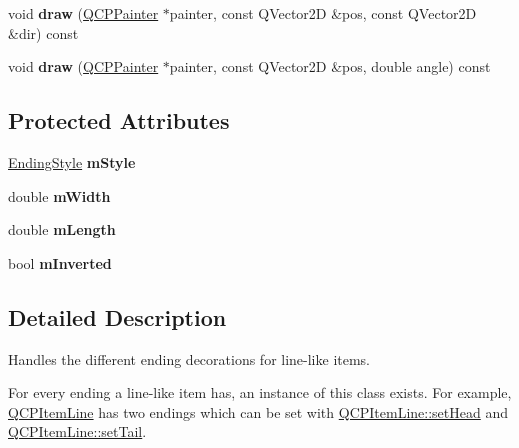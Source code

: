 \begin{DoxyCompactItemize}
\item 
\hypertarget{classQCPLineEnding_ac4b2fa94bd27b2f008b5fc090fcd7c0b}{void {\bfseries draw} (\hyperlink{classQCPPainter}{Q\-C\-P\-Painter} $\ast$painter, const Q\-Vector2\-D \&pos, const Q\-Vector2\-D \&dir) const }\label{classQCPLineEnding_ac4b2fa94bd27b2f008b5fc090fcd7c0b}

\item 
\hypertarget{classQCPLineEnding_a05c143b1f66cb68d746c309523c45e3e}{void {\bfseries draw} (\hyperlink{classQCPPainter}{Q\-C\-P\-Painter} $\ast$painter, const Q\-Vector2\-D \&pos, double angle) const }\label{classQCPLineEnding_a05c143b1f66cb68d746c309523c45e3e}

\end{DoxyCompactItemize}
\subsection*{Protected Attributes}
\begin{DoxyCompactItemize}
\item 
\hypertarget{classQCPLineEnding_a4696fc9117b60f1ca7690fcd2ba56611}{\hyperlink{classQCPLineEnding_a5ef16e6876b4b74959c7261d8d4c2cd5}{Ending\-Style} {\bfseries m\-Style}}\label{classQCPLineEnding_a4696fc9117b60f1ca7690fcd2ba56611}

\item 
\hypertarget{classQCPLineEnding_aca89d21341133c20dc6825c33a5eac48}{double {\bfseries m\-Width}}\label{classQCPLineEnding_aca89d21341133c20dc6825c33a5eac48}

\item 
\hypertarget{classQCPLineEnding_ae8e1e2566b96c05736cd92662dba8af8}{double {\bfseries m\-Length}}\label{classQCPLineEnding_ae8e1e2566b96c05736cd92662dba8af8}

\item 
\hypertarget{classQCPLineEnding_a91306fe771d54c955e0af21af14349d5}{bool {\bfseries m\-Inverted}}\label{classQCPLineEnding_a91306fe771d54c955e0af21af14349d5}

\end{DoxyCompactItemize}


\subsection{Detailed Description}
Handles the different ending decorations for line-\/like items. 

 For every ending a line-\/like item has, an instance of this class exists. For example, \hyperlink{classQCPItemLine}{Q\-C\-P\-Item\-Line} has two endings which can be set with \hyperlink{classQCPItemLine_aebf3d687114d584e0459db6759e2c3c3}{Q\-C\-P\-Item\-Line\-::set\-Head} and \hyperlink{classQCPItemLine_ac264222c3297a7efe33df9345c811a5f}{Q\-C\-P\-Item\-Line\-::set\-Tail}.

